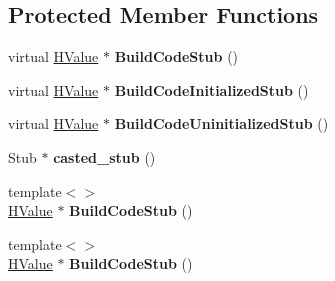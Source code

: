 \subsection*{Protected Member Functions}
\begin{DoxyCompactItemize}
\item 
virtual \hyperlink{classv8_1_1internal_1_1_h_value}{H\+Value} $\ast$ {\bfseries Build\+Code\+Stub} ()\hypertarget{classv8_1_1internal_1_1_code_stub_graph_builder_aa95c2e46b376237c77ecb1fe26fe6945}{}\label{classv8_1_1internal_1_1_code_stub_graph_builder_aa95c2e46b376237c77ecb1fe26fe6945}

\item 
virtual \hyperlink{classv8_1_1internal_1_1_h_value}{H\+Value} $\ast$ {\bfseries Build\+Code\+Initialized\+Stub} ()\hypertarget{classv8_1_1internal_1_1_code_stub_graph_builder_a326e25bb79fa03fb3feef4281462e6cf}{}\label{classv8_1_1internal_1_1_code_stub_graph_builder_a326e25bb79fa03fb3feef4281462e6cf}

\item 
virtual \hyperlink{classv8_1_1internal_1_1_h_value}{H\+Value} $\ast$ {\bfseries Build\+Code\+Uninitialized\+Stub} ()\hypertarget{classv8_1_1internal_1_1_code_stub_graph_builder_ada64084a6723f763ea9c8bc534ef08ec}{}\label{classv8_1_1internal_1_1_code_stub_graph_builder_ada64084a6723f763ea9c8bc534ef08ec}

\item 
Stub $\ast$ {\bfseries casted\+\_\+stub} ()\hypertarget{classv8_1_1internal_1_1_code_stub_graph_builder_a86a5f776b83d893110bee92b9374249a}{}\label{classv8_1_1internal_1_1_code_stub_graph_builder_a86a5f776b83d893110bee92b9374249a}

\item 
{\footnotesize template$<$$>$ }\\\hyperlink{classv8_1_1internal_1_1_h_value}{H\+Value} $\ast$ {\bfseries Build\+Code\+Stub} ()\hypertarget{classv8_1_1internal_1_1_code_stub_graph_builder_a92c5dff1a95b5f0c1e76d586d895da52}{}\label{classv8_1_1internal_1_1_code_stub_graph_builder_a92c5dff1a95b5f0c1e76d586d895da52}

\item 
{\footnotesize template$<$$>$ }\\\hyperlink{classv8_1_1internal_1_1_h_value}{H\+Value} $\ast$ {\bfseries Build\+Code\+Stub} ()\hypertarget{classv8_1_1internal_1_1_code_stub_graph_builder_af90329a8086c723573ad8555fc946113}{}\label{classv8_1_1internal_1_1_code_stub_graph_builder_af90329a8086c723573ad8555fc946113}


\end{DoxyCompactItemize}
